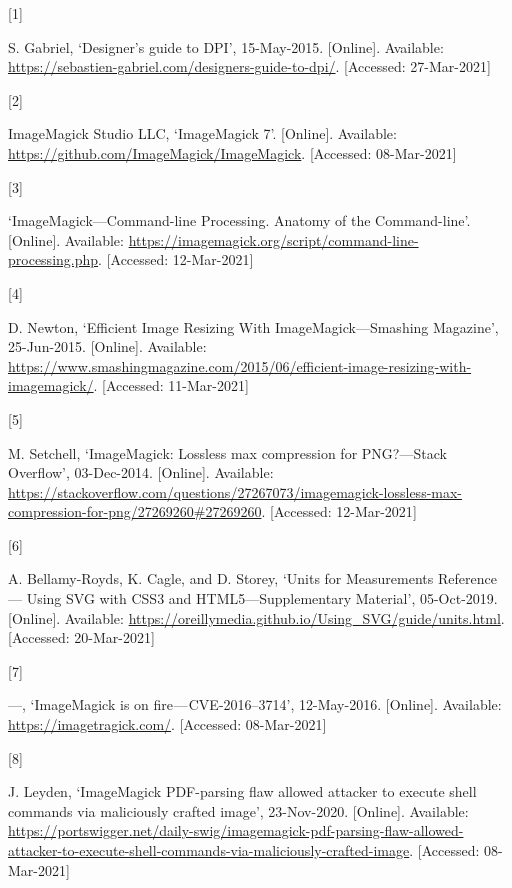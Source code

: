 \documentclass[
  12pt,
  british,
  a4paper,
  rgb,
  dvipsnames,
  svgnames,
  hyphens]{article}
\newlength{\cslhangindent}
\newlength{\csllabelwidth}
\newenvironment{CSLReferences}[2] %
 {%
  \setlength{\parindent}{0pt}
  \ifodd #1 \everypar{\setlength{\hangindent}{\cslhangindent}}\ignorespaces\fi
  \ifnum #2 > 0
  \setlength{\parskip}{#2\baselineskip}
  \fi
 }%
 {}
\newcommand{\CSLLeftMargin}[1]{\parbox[t]{\csllabelwidth}{#1}}
\newcommand{\CSLRightInline}[1]{\parbox[t]{\linewidth - \csllabelwidth}{#1}\break}
\begin{document}
\hypertarget{refs}{}
\begin{CSLReferences}{0}{0}
\leavevmode{}%
\CSLLeftMargin{{[}1{]} }
\CSLRightInline{S. Gabriel, {`{Designer's guide to DPI}'}, 15-May-2015.
{[}Online{]}. Available:
\url{https://sebastien-gabriel.com/designers-guide-to-dpi/}.
{[}Accessed: 27-Mar-2021{]}}

\leavevmode{}%
\CSLLeftMargin{{[}2{]} }
\CSLRightInline{ImageMagick Studio LLC, {`ImageMagick 7'}. {[}Online{]}.
Available: \url{https://github.com/ImageMagick/ImageMagick}.
{[}Accessed: 08-Mar-2021{]}}

\leavevmode{}%
\CSLLeftMargin{{[}3{]} }
\CSLRightInline{{`{ImageMagick---Command-line Processing}. {Anatomy of
the Command-line}'}. {[}Online{]}. Available:
\url{https://imagemagick.org/script/command-line-processing.php}.
{[}Accessed: 12-Mar-2021{]}}

\leavevmode{}%
\CSLLeftMargin{{[}4{]} }
\CSLRightInline{D. Newton, {`{Efficient Image Resizing With
ImageMagick---Smashing Magazine}'}, 25-Jun-2015. {[}Online{]}.
Available:
\url{https://www.smashingmagazine.com/2015/06/efficient-image-resizing-with-imagemagick/}.
{[}Accessed: 11-Mar-2021{]}}

\leavevmode{}%
\CSLLeftMargin{{[}5{]} }
\CSLRightInline{M. Setchell, {`{ImageMagick: Lossless max compression
for PNG?---Stack Overflow}'}, 03-Dec-2014. {[}Online{]}. Available:
\url{https://stackoverflow.com/questions/27267073/imagemagick-lossless-max-compression-for-png/27269260\#27269260}.
{[}Accessed: 12-Mar-2021{]}}

\leavevmode{}%
\CSLLeftMargin{{[}6{]} }
\CSLRightInline{A. Bellamy-Royds, K. Cagle, and D. Storey, {`{Units for
Measurements Reference --- Using SVG with CSS3 and HTML5---Supplementary
Material}'}, 05-Oct-2019. {[}Online{]}. Available:
\url{https://oreillymedia.github.io/Using_SVG/guide/units.html}.
{[}Accessed: 20-Mar-2021{]}}

\leavevmode{}%
\CSLLeftMargin{{[}7{]} }
\CSLRightInline{---, {`ImageMagick is on fire --- CVE-2016--3714'},
12-May-2016. {[}Online{]}. Available: \url{https://imagetragick.com/}.
{[}Accessed: 08-Mar-2021{]}}

\leavevmode{}%
\CSLLeftMargin{{[}8{]} }
\CSLRightInline{J. Leyden, {`ImageMagick PDF-parsing flaw allowed
attacker to execute shell commands via maliciously crafted image'},
23-Nov-2020. {[}Online{]}. Available:
\url{https://portswigger.net/daily-swig/imagemagick-pdf-parsing-flaw-allowed-attacker-to-execute-shell-commands-via-maliciously-crafted-image}.
{[}Accessed: 08-Mar-2021{]}}


\end{CSLReferences}
\end{document}
